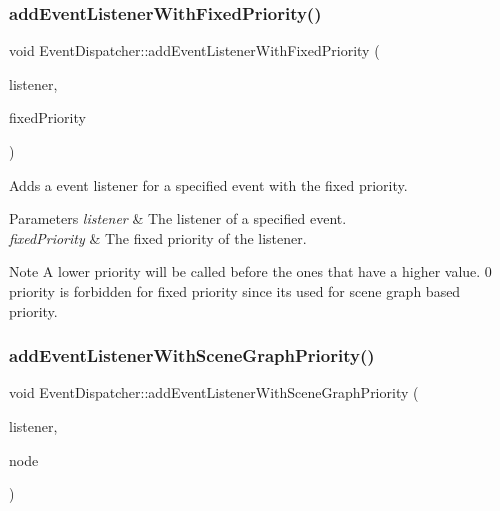 \subsubsection{\texorpdfstring{add\+Event\+Listener\+With\+Fixed\+Priority()}{addEventListenerWithFixedPriority()}\hspace{0.1cm}{\footnotesize\ttfamily [2/2]}}
{\footnotesize\ttfamily void Event\+Dispatcher\+::add\+Event\+Listener\+With\+Fixed\+Priority (\begin{DoxyParamCaption}\item[{\hyperlink{classEventListener}{Event\+Listener} $\ast$}]{listener,  }\item[{int}]{fixed\+Priority }\end{DoxyParamCaption})}

Adds a event listener for a specified event with the fixed priority. 
\begin{DoxyParams}{Parameters}
{\em listener} & The listener of a specified event. \\
\hline
{\em fixed\+Priority} & The fixed priority of the listener. \\
\hline
\end{DoxyParams}
\begin{DoxyNote}{Note}
A lower priority will be called before the ones that have a higher value. 0 priority is forbidden for fixed priority since it\textquotesingle{}s used for scene graph based priority. 
\end{DoxyNote}
\mbox{\label{classEventDispatcher_a90b97ea5ad9bff4d684ca5bb6d5618bc}} 
\subsubsection{\texorpdfstring{add\+Event\+Listener\+With\+Scene\+Graph\+Priority()}{addEventListenerWithSceneGraphPriority()}\hspace{0.1cm}{\footnotesize\ttfamily [1/2]}}
{\footnotesize\ttfamily void Event\+Dispatcher\+::add\+Event\+Listener\+With\+Scene\+Graph\+Priority (\begin{DoxyParamCaption}\item[{\hyperlink{classEventListener}{Event\+Listener} $\ast$}]{listener,  }\item[{\hyperlink{classNode}{Node} $\ast$}]{node }\end{DoxyParamCaption})}

